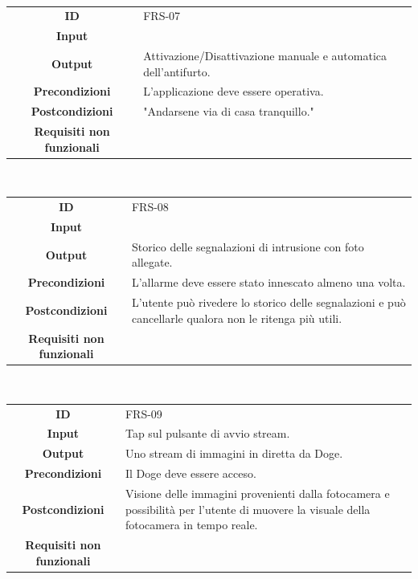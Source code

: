 \documentclass{article}
\begin{document}
~

\begin{adjustbox}{center}
\begin{tabular}{|c|p{10cm}|}
\hline
\textbf{ID} & FRS-07\\
\textbf{Input} &\\
\textbf{Output} & Attivazione/Disattivazione manuale e automatica dell'antifurto.\\
\textbf{Precondizioni} & L'applicazione deve essere operativa.\\
\textbf{Postcondizioni} & "Andarsene via di casa tranquillo."\\
\textbf{Requisiti non funzionali} &\\
\hline
\end{tabular}
\end{adjustbox}

~

\begin{adjustbox}{center}
\begin{tabular}{|c|p{10cm}|}
\hline
\textbf{ID} & FRS-08 \\
\textbf{Input} &  \\
\textbf{Output} & Storico delle segnalazioni di intrusione con foto allegate. \\
\textbf{Precondizioni} & L'allarme deve essere stato innescato almeno una volta. \\
\textbf{Postcondizioni} & L'utente può rivedere lo storico delle segnalazioni e può cancellarle  qualora non le ritenga più utili. \\
\textbf{Requisiti non funzionali} &  \\
\hline
\end{tabular}
\end{adjustbox}

~

\begin{adjustbox}{center}
\begin{tabular}{|c|p{10cm}|}
\hline
\textbf{ID} & FRS-09\\
\textbf{Input} & Tap sul pulsante di avvio stream.\\
\textbf{Output} & Uno stream di immagini in diretta da Doge.\\
\textbf{Precondizioni} & Il Doge deve essere acceso.\\
\textbf{Postcondizioni} & Visione delle immagini provenienti dalla fotocamera e possibilità per l'utente di muovere la visuale della fotocamera in tempo reale.\\
\textbf{Requisiti non funzionali} &\\
\hline
\end{tabular}
\end{adjustbox}
\end{document}
